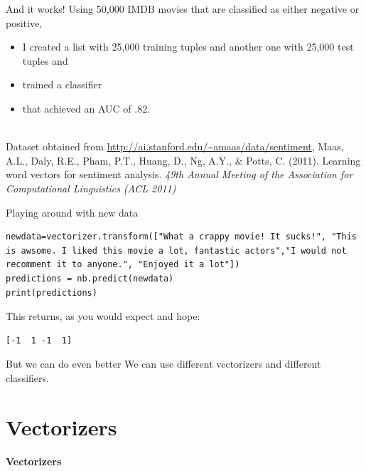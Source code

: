 \documentclass{beamer}
\begin{document}
\begin{frame}{And it works!}
Using 50,000 IMDB movies that are classified as either negative or positive,
\begin{itemize}
\item I created a list with 25,000 training tuples and another one with 25,000 test tuples and
\item trained a classifier
\item that achieved an AUC of .82.
\end{itemize}
~\\
\tiny{Dataset obtained from \url{http://ai.stanford.edu/~amaas/data/sentiment}, Maas, A.L., Daly, R.E., Pham, P.T., Huang, D., Ng, A.Y., \& Potts, C. (2011). Learning word vectors for sentiment analysis. \emph{49th Annual Meeting of the Association for Computational Linguistics (ACL 2011)}
}

\end{frame}

\begin{frame}[fragile]{Playing around with new data}
\begin{lstlisting}
newdata=vectorizer.transform(["What a crappy movie! It sucks!", "This is awsome. I liked this movie a lot, fantastic actors","I would not recomment it to anyone.", "Enjoyed it a lot"])
predictions = nb.predict(newdata)
print(predictions)
\end{lstlisting}
This returns, as you would expect and hope:
\begin{lstlisting} 
[-1  1 -1  1]
\end{lstlisting}


\end{frame}




\begin{frame}{But we can do even better}
We can use different vectorizers and different classifiers.
\end{frame}



\section{Vectorizers}

\begin{frame}[plain]
\textbf{Vectorizers}
\end{frame}
\end{document}
